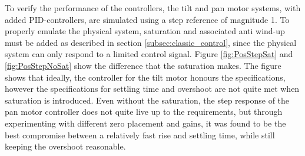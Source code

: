 \documentclass[../../main.tex]{subfiles}
\begin{document}
To verify the performance of the controllers, the tilt and pan motor systems, with added PID-controllers, are simulated using a step reference of magnitude 1. To properly emulate the physical system, saturation and associated anti wind-up must be added as described in section \ref{subsec:classic_control}, since the physical system can only respond to a limited control signal. Figure \ref{fig:PosStepSat} and \ref{fig:PosStepNoSat} show the difference that the saturation makes. The figure shows that ideally, the controller for the tilt motor honours the specifications, however the specifications for settling time and overshoot are not quite met when saturation is introduced. Even without the saturation, the step response of the pan motor controller does not quite live up to the  requirements, but through experimenting with different zero placement and gains, it was found to be the best compromise between a relatively fast rise and settling time, while still keeping the overshoot reasonable.
\end{document}
